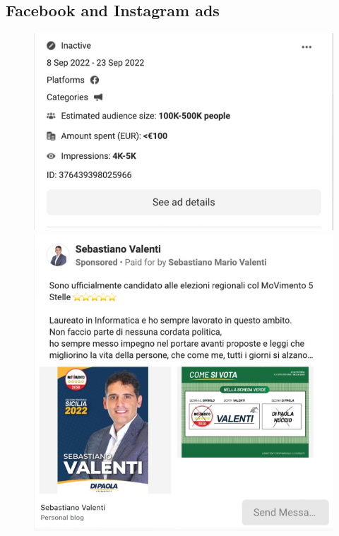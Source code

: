 \documentclass[sigconf,screen]{acmart}
\begin{document}
\subsection{Facebook and Instagram ads}



\begin{figure}[!t]
    \centering
    \begin{minipage}{0.48\linewidth}
        \centering
        \includegraphics[width=\linewidth]{ad_example_left.jpg}
    \end{minipage}
    \hfill
    \begin{minipage}{0.48\linewidth}
        \centering
        \includegraphics[width=\linewidth]{ad_example_right.jpg}

\end{minipage}
\end{figure}
\end{document}
